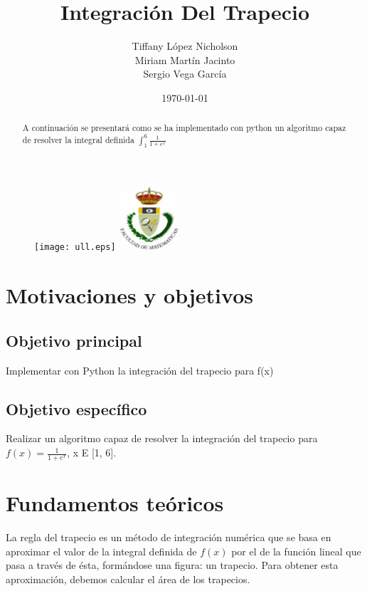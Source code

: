 \documentclass{article}
\begin{document}
  \begin{figure}[lt]
    \texttt{[image: ull.eps]}
	\includegraphics[width=0.2\textwidth]{fmatesc.eps}
  \end{figure}
  \title{Integración Del Trapecio}
  \author{Tiffany López Nicholson \\ Miriam Martín Jacinto \\ Sergio Vega García}
  \date{\today}
  \maketitle

  \begin{abstract}
    \begin{center}
       A continuación se presentará como se ha implementado con python un algoritmo capaz de resolver la integral definida $\int_{1}^{6} \frac{1}{1+e^x}$
    \end{center}
  \end{abstract}
  \pagebreak


  \tableofcontents
  \pagebreak
  
  
  \section{Motivaciones y objetivos}
    \subsection{Objetivo principal}
       Implementar con Python la integración del trapecio para f(x) %
    \subsection{Objetivo específico} 
       Realizar un algoritmo capaz de resolver la integración del trapecio para $ f(x) = \frac{1}{1 + e^{x}}$, x E [1, 6]. %
  \pagebreak


  \section{Fundamentos teóricos}
    La regla del trapecio es un método de integración numérica que se basa en aproximar el valor de la integral definida de $f(x)$ por el de la función lineal que pasa a través de ésta, formándose una figura: un trapecio. Para obtener esta aproximación, debemos calcular el área de los trapecios.
    
\end{document}
